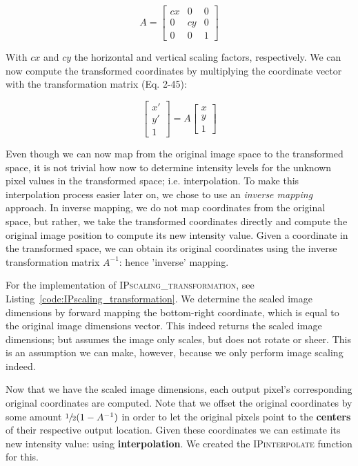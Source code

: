 \documentclass{article}
\begin{document}
\begin{figure}[ht]
\[A = 
\begin{bmatrix}
cx & 0 & 0\\
0 & cy & 0\\
0 & 0 & 1
\end{bmatrix}
 \]
\end{figure}

With $cx$ and $cy$ the horizontal and vertical scaling factors, respectively. We can now compute the transformed coordinates by multiplying the coordinate vector with the transformation matrix (Eq. 2-45):

\begin{figure}[ht]
\[ 
\begin{bmatrix}
x'\\
y'\\
1
\end{bmatrix}
= A
\begin{bmatrix}
x\\
y\\
1
\end{bmatrix}
 \]
\end{figure}

Even though we can now map from the original image space to the transformed space, it is not trivial how now to determine intensity levels for the unknown pixel values in the transformed space; i.e. interpolation. To make this interpolation process easier later on, we chose to use an \textit{inverse mapping} approach. In inverse mapping, we do not map coordinates from the original space, but rather, we take the transformed coordinates directly and compute the original image position to compute its new intensity value. Given a coordinate in the transformed space, we can obtain its original coordinates using the inverse transformation matrix $A^{-1}$: hence 'inverse' mapping.

 For the implementation of \textsc{IPscaling\_transformation}, see Listing~\ref{code:IPscaling_transformation}. We determine the scaled image dimensions by forward mapping the bottom-right coordinate, which is equal to the original image dimensions vector. This indeed returns the scaled image dimensions; but assumes the image only scales, but does not rotate or sheer. This is an assumption we can make, however, because we only perform image scaling indeed.

Now that we have the scaled image dimensions, each output pixel's corresponding original coordinates are computed. Note that we offset the original coordinates by some amount $\sfrac{1}{2}(1 - A^{-1})$ in order to let the original pixels point to the \textbf{centers} of their respective output location.
Given these coordinates we can estimate its new intensity value: using \textbf{interpolation}. We created the \textsc{IPinterpolate} function for this.
\end{document}
